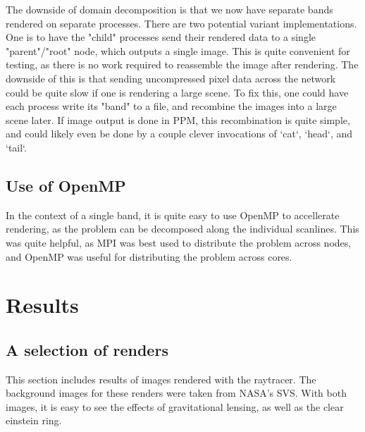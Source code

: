 The downside of domain decomposition is that we now have separate bands rendered on separate processes. There are two potential variant implementations. One is to have the "child" processes send their rendered data to a single "parent"/"root" node, which outputs a single image. This is quite convenient for testing, as there is no work required to reassemble the image after rendering. The downside of this is that sending uncompressed pixel data across the network could be quite slow if one is rendering a large scene. To fix this, one could have each process write its "band" to a file, and recombine the images into a large scene later. If image output is done in PPM, this recombination is quite simple, and could likely even be done by a couple clever invocations of `cat`, `head`, and `tail`.

\subsection {Use of OpenMP}

In the context of a single band, it is quite easy to use OpenMP to accellerate rendering, as the problem can be decomposed along the individual scanlines. This was quite helpful, as MPI was best used to distribute the problem across nodes, and OpenMP was useful for distributing the problem across cores. 


\section{Results}
\label{sec:results}

\subsection {A selection of renders}

This section includes results of images rendered with the raytracer. The background images for these renders were taken from NASA's SVS. With both images, it is easy to see the effects of gravitational lensing, as well as the clear einstein ring. 



